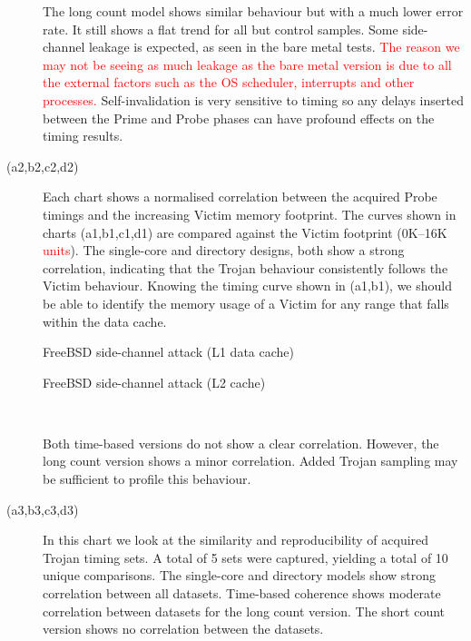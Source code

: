 \begin{description}
				The long count model shows similar behaviour but with a much lower error rate. It still shows a flat trend for all but control samples. Some side-channel leakage is expected, as seen in the bare metal tests. 
				\textcolor{red}{The reason we may not be seeing as much leakage as the bare metal version is due to all the external factors such as the OS scheduler, interrupts and other processes.}
				Self-invalidation is very sensitive to timing so any delays inserted between the Prime and Probe phases can have profound effects on the timing results. 
			\item [(a2,b2,c2,d2)] 
				Each chart shows a normalised correlation between the acquired Probe timings and the increasing Victim memory footprint. The curves shown in charts (a1,b1,c1,d1) are compared against the Victim footprint (0K--16K \textcolor{red}{units}). 
				The single-core and directory designs, both show a strong correlation, indicating that the Trojan behaviour consistently follows the Victim behaviour. Knowing the timing curve shown in (a1,b1), we should be able to identify the memory usage of a Victim for any range that falls within the data cache.
			\end{description}

\clearpage
			\begin{figure}[!h]
			\centering 
				\caption{FreeBSD side-channel attack (L1 data cache)} 
				\label{freebsd_sca_corepin_1}
			\end{figure}

			\begin{figure}[!h]
			\centering 
				\caption{FreeBSD side-channel attack (L2 cache)} 
				\label{freebsd_sca_corepin_2}
			\end{figure}

\clearpage
			\begin{description}
			\item[\ \ \ \ \ ]
				Both time-based versions do not show a clear correlation. However, the long count version shows a minor correlation. Added Trojan sampling may be sufficient to profile this behaviour.
			\item [(a3,b3,c3,d3)] 
				In this chart we look at the similarity and reproducibility of acquired Trojan timing sets. A total of 5 sets were captured, yielding a total of 10 unique comparisons. The single-core and directory models show strong correlation between all datasets. Time-based coherence shows moderate correlation between datasets for the long count version. The short count version shows no correlation between the datasets.
			\end{description}
			
